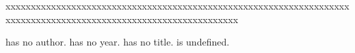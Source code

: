 \documentclass{article}
\begin{document}
xxxxxxxxxxxxxxxxxxxxxxxxxxxxxxxxxxxxxxxxxxxxxxxxxxxxxxxxxxxxxxxxxxxxxxxxxxxxxxxxxxxxxxxxxxxxxxxxxxxxxxxxxxxxxxxxxx

\cite{noauthor} has no author.
\cite{noyear} has no year.
\cite{notitle} has no title.
\cite{undefined} is undefined.



\end{document}

